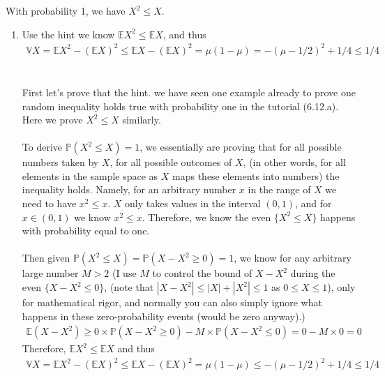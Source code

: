 

\setcounter{theorem}{50}
\begin{exercise}[BH.5.51]
\begin{hint}
	With probability 1, we have $X^2 \leq X$.
\end{hint}
\begin{solution}
    \begin{enumerate}
	    \item Use the hint we know $\mathbb{E}X^2\leq \mathbb{E}X$, and thus 
    	\begin{align*}
    		\mathbb{V}X= \mathbb{E}X^2-(\mathbb{E}X)^2\leq \mathbb{E}X-(\mathbb{E}X)^2=\mu(1-\mu) = -(\mu-1/2)^2 +1/4\leq  1/4 
    	\end{align*} 
    	~\\~\\
    	First let's prove that the hint. we have seen one example already to prove one random inequality holds true with probability one in the tutorial (6.12.a). Here we prove $X^2\leq X$ similarly. \\~\\
    	To derive $\mathbb{P}(X^2\leq X) =1$, we essentially are proving that for all possible numbers taken by $X$, for all possible outcomes of $X$, (in other words, for all elements in the sample space as $X$ maps these elements into numbers) the inequality holds. Namely, for an arbitrary number $x$ in the range of $X$ we need to have $x^2\leq x$. $X$ only takes values in the interval $(0,1)$, and for $x\in(0,1)$ we know $x^2\leq x$. Therefore, we know the even $\{X^2\leq X\}$ happens with probability equal to one.     \\~\\
    	Then given $\mathbb{P}(X^2\leq X)=\mathbb{P}( X-X^2\geq 0)=1$,
    	we know for any arbitrary large number $M>2$ (I use $M$ to control the bound of $X-X^2$ during the even $\{X-X^2\leq 0\}$, (note that $|X-X^2|\leq|X|+|X^2| \leq 1$ as $0\leq X\leq 1$), only for mathematical rigor, and normally you can also simply ignore what happens in these zero-probability events (would be zero anyway).)
    	\begin{align*}
    		\mathbb{E}(X-X^2) \geq 0 \times  \mathbb{P}( X-X^2\geq 0) - M \times  \mathbb{P}( X-X^2\leq 0)=0-M\times 0=0 
    	\end{align*}
    	Therefore, $\mathbb{E}X^2\leq \mathbb{E}X$ and thus 
    	\begin{align*}
    		\mathbb{V}X= \mathbb{E}X^2-(\mathbb{E}X)^2\leq \mathbb{E}X-(\mathbb{E}X)^2=\mu(1-\mu) \leq -(\mu-1/2)^2 +1/4\leq  1/4 
    	\end{align*} 
    	

\end{enumerate}
\end{solution}
\end{exercise}

